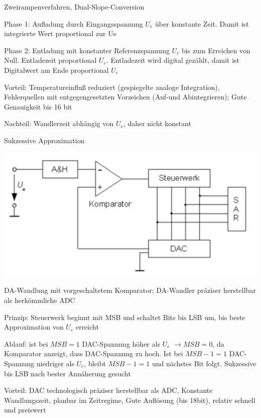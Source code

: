 \documentclass[a4paper]{article}
\begin{document}
\begin{multicols}{3}
  Zweirampenverfahren, Dual-Slope-Conversion
  \begin{itemize*}
    \item Phase 1: Aufladung durch Eingangsspannung $U_e$ über konstante Zeit. Damit ist integrierte Wert proportional zur Ue
    \item Phase 2: Entladung mit konstanter Referenzspannung $U_r$ bis zum Erreichen von Null. Entladezeit proportional $U_e$. Entladezeit wird digital gezählt, damit ist Digitalwert am Ende proportional $U_e$
    \item Vorteil: Temperatureinfluß reduziert (gespiegelte analoge Integration), Fehlerquellen mit entgegengesetzten Vorzeichen (Auf-und Abintegrieren); Gute Genauigkeit bis 16 bit
    \item Nachteil: Wandlerzeit abhängig von $U_e$, daher nicht konstant
  \end{itemize*}

  Sukzessive Approximation
  \begin{center}
    \includegraphics[width=.4\linewidth]{Assets/Biosignalverarbeitung-Sukzessive-Approximation.png}
  \end{center}
  \begin{itemize*}
    \item DA-Wandlung mit vorgeschaltetem Komparator; DA-Wandler präziser herstellbar als herkömmliche ADC
    \item Prinzip: Steuerwerk beginnt mit MSB und schaltet Bits bis LSB um, bis beste Approximation von $U_e$ erreicht
    \item Ablauf: ist bei $MSB=1$ DAC-Spannung höher als $U_e$ $\rightarrow MSB=0$, da Komparator anzeigt, dass DAC-Spannung zu hoch. Ist bei $MSB-1=1$ DAC-Spannung niedriger als $U_e$, bleibt $MSB-1=1$ und nächstes Bit folgt. Sukzessive bis LSB nach bester Annäherung gesucht
    \item Vorteil: DAC technologisch präziser herstellbar als ADC, Konstante Wandlungszeit, planbar im Zeitregime, Gute Auflösung (bis 18bit), relativ schnell und preiswert
  \end{itemize*}


\end{multicols}
\end{document}
